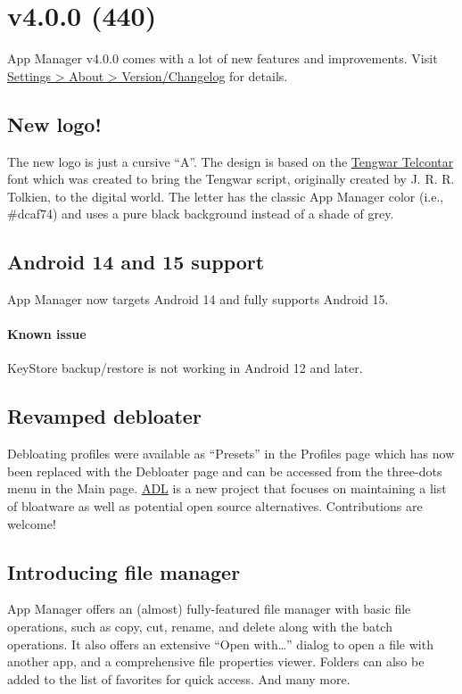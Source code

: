 \section{v4.0.0 (440)}\label{sec:v4.0.0-(440)}

App Manager v4.0.0 comes with a lot of new features and improvements. Visit
\href{app-manager://settings/about/version}{Settings > About > Version/Changelog} for details.

\subsection{New logo!}
The new logo is just a cursive ``A''. The design is based on the
\href{https://freetengwar.sourceforge.net/}{Tengwar Telcontar} font which was created to bring the
Tengwar script, originally created by J. R. R. Tolkien, to the digital world. The letter has the
classic App Manager color (i.e., \#dcaf74) and uses a pure black background instead of a shade of
grey.

\subsection{Android 14 and 15 support}
App Manager now targets Android 14 and fully supports Android 15.

\paragraph{Known issue} KeyStore backup/restore is not working in Android 12 and later.

\subsection{Revamped debloater}
Debloating profiles were available as ``Presets'' in the Profiles page which has now been replaced
with the Debloater page and can be accessed from the three-dots menu in the Main page.
\href{https://github.com/MuntashirAkon/android-debloat-list}{ADL} is a new project that focuses on
maintaining a list of bloatware as well as potential open source alternatives. Contributions are
welcome!

\subsection{Introducing file manager}
App Manager offers an (almost) fully-featured file manager with basic file operations, such as copy,
cut, rename, and delete along with the batch operations. It also offers an extensive ``Open with\dots''
dialog to open a file with another app, and a comprehensive file properties viewer. Folders can also
be added to the list of favorites for quick access. And many more.

